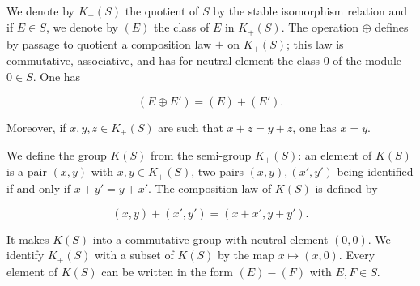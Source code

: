 We denote by $K_+(S)$ the quotient of $S$ by the stable isomorphism relation and if $E \in S$, we denote by $(E)$ the class of $E$ in $K_+(S)$. The operation $\oplus$ defines by passage to quotient a composition law $+$ on $K_+(S)$; this law is commutative, associative, and has for neutral element the class $0$ of the module $0 \in S$. One has

$$(E \oplus E') = (E) + (E').$$

Moreover, if $x, y, z \in K_+(S)$ are such that $x + z = y + z$, one has $x = y$.

We define the group $K(S)$ from the semi-group $K_+(S)$: an element of $K(S)$ is a pair $(x, y)$ with $x, y \in K_+(S)$, two pairs $(x, y), (x', y')$ being identified if and only if $x + y' = y + x'$. The composition law of $K(S)$ is defined by

$$(x, y) + (x', y') = (x + x', y + y').$$

It makes $K(S)$ into a commutative group with neutral element $(0, 0)$. We identify $K_+(S)$ with a subset of $K(S)$ by the map $x \mapsto (x, 0)$. Every element of $K(S)$ can be written in the form $(E) - (F)$ with $E, F \in S$.
